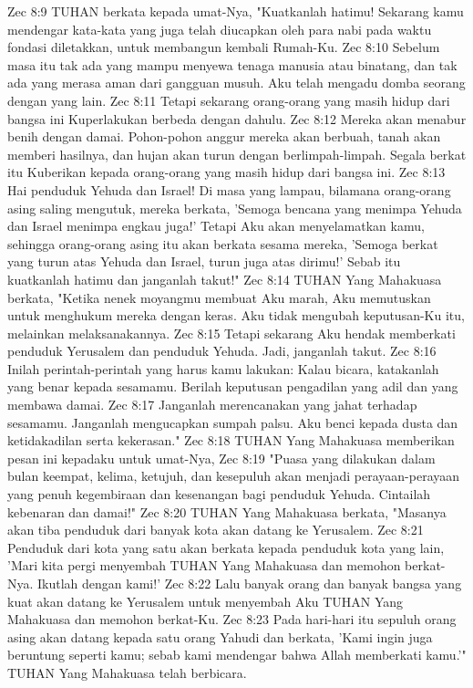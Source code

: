 Zec 8:9  TUHAN berkata kepada umat-Nya, "Kuatkanlah hatimu! Sekarang kamu mendengar kata-kata yang juga telah diucapkan oleh para nabi pada waktu fondasi diletakkan, untuk membangun kembali Rumah-Ku.
Zec 8:10  Sebelum masa itu tak ada yang mampu menyewa tenaga manusia atau binatang, dan tak ada yang merasa aman dari gangguan musuh. Aku telah mengadu domba seorang dengan yang lain.
Zec 8:11  Tetapi sekarang orang-orang yang masih hidup dari bangsa ini Kuperlakukan berbeda dengan dahulu.
Zec 8:12  Mereka akan menabur benih dengan damai. Pohon-pohon anggur mereka akan berbuah, tanah akan memberi hasilnya, dan hujan akan turun dengan berlimpah-limpah. Segala berkat itu Kuberikan kepada orang-orang yang masih hidup dari bangsa ini.
Zec 8:13  Hai penduduk Yehuda dan Israel! Di masa yang lampau, bilamana orang-orang asing saling mengutuk, mereka berkata, 'Semoga bencana yang menimpa Yehuda dan Israel menimpa engkau juga!' Tetapi Aku akan menyelamatkan kamu, sehingga orang-orang asing itu akan berkata sesama mereka, 'Semoga berkat yang turun atas Yehuda dan Israel, turun juga atas dirimu!' Sebab itu kuatkanlah hatimu dan janganlah takut!"
Zec 8:14  TUHAN Yang Mahakuasa berkata, "Ketika nenek moyangmu membuat Aku marah, Aku memutuskan untuk menghukum mereka dengan keras. Aku tidak mengubah keputusan-Ku itu, melainkan melaksanakannya.
Zec 8:15  Tetapi sekarang Aku hendak memberkati penduduk Yerusalem dan penduduk Yehuda. Jadi, janganlah takut.
Zec 8:16  Inilah perintah-perintah yang harus kamu lakukan: Kalau bicara, katakanlah yang benar kepada sesamamu. Berilah keputusan pengadilan yang adil dan yang membawa damai.
Zec 8:17  Janganlah merencanakan yang jahat terhadap sesamamu. Janganlah mengucapkan sumpah palsu. Aku benci kepada dusta dan ketidakadilan serta kekerasan."
Zec 8:18  TUHAN Yang Mahakuasa memberikan pesan ini kepadaku untuk umat-Nya,
Zec 8:19  "Puasa yang dilakukan dalam bulan keempat, kelima, ketujuh, dan kesepuluh akan menjadi perayaan-perayaan yang penuh kegembiraan dan kesenangan bagi penduduk Yehuda. Cintailah kebenaran dan damai!"
Zec 8:20  TUHAN Yang Mahakuasa berkata, "Masanya akan tiba penduduk dari banyak kota akan datang ke Yerusalem.
Zec 8:21  Penduduk dari kota yang satu akan berkata kepada penduduk kota yang lain, 'Mari kita pergi menyembah TUHAN Yang Mahakuasa dan memohon berkat-Nya. Ikutlah dengan kami!'
Zec 8:22  Lalu banyak orang dan banyak bangsa yang kuat akan datang ke Yerusalem untuk menyembah Aku TUHAN Yang Mahakuasa dan memohon berkat-Ku.
Zec 8:23  Pada hari-hari itu sepuluh orang asing akan datang kepada satu orang Yahudi dan berkata, 'Kami ingin juga beruntung seperti kamu; sebab kami mendengar bahwa Allah memberkati kamu.'" TUHAN Yang Mahakuasa telah berbicara.
